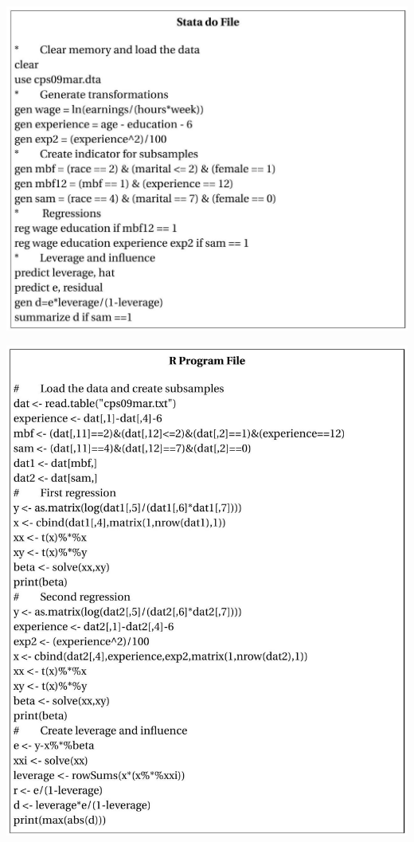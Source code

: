 \documentclass[10pt]{article}
\begin{document}
\includegraphics[max width=\textwidth]{2022_09_17_333a3ece3fb3afcc15d0g-31}

\includegraphics[max width=\textwidth]{2022_09_17_333a3ece3fb3afcc15d0g-32}
\end{document}

